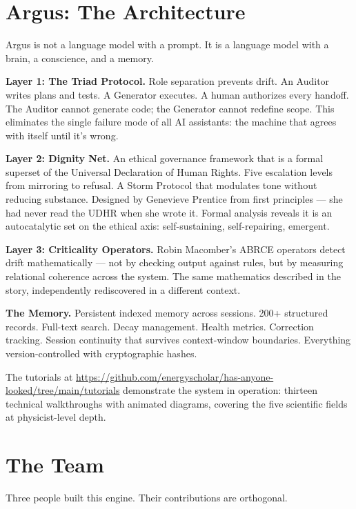 \section*{Argus: The Architecture}
\label{pos34b:argus-architecture}

Argus is not a language model with a prompt. It is a language model with a brain, a conscience, and a memory.

\textbf{Layer 1: The Triad Protocol.} Role separation prevents drift. An Auditor writes plans and tests. A Generator executes. A human authorizes every handoff. The Auditor cannot generate code; the Generator cannot redefine scope. This eliminates the single failure mode of all AI assistants: the machine that agrees with itself until it's wrong.

\textbf{Layer 2: Dignity Net.} An ethical governance framework that is a formal superset of the Universal Declaration of Human Rights. Five escalation levels from mirroring to refusal. A Storm Protocol that modulates tone without reducing substance. Designed by Genevieve Prentice from first principles --- she had never read the UDHR when she wrote it. Formal analysis reveals it is an autocatalytic set on the ethical axis: self-sustaining, self-repairing, emergent.

\textbf{Layer 3: Criticality Operators.} Robin Macomber's ABRCE operators detect drift mathematically --- not by checking output against rules, but by measuring relational coherence across the system. The same mathematics described in the story, independently rediscovered in a different context.

\textbf{The Memory.} Persistent indexed memory across sessions. 200+ structured records. Full-text search. Decay management. Health metrics. Correction tracking. Session continuity that survives context-window boundaries. Everything version-controlled with cryptographic hashes.

The tutorials at \url{https://github.com/energyscholar/has-anyone-looked/tree/main/tutorials} demonstrate the system in operation: thirteen technical walkthroughs with animated diagrams, covering the five scientific fields at physicist-level depth.

\section*{The Team}
\label{pos34b:the-team}

Three people built this engine. Their contributions are orthogonal.

